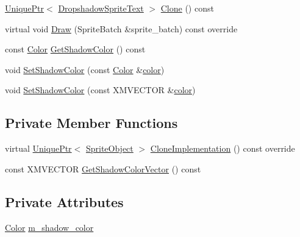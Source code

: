 \begin{DoxyCompactItemize}
\item 
\hyperlink{namespacemage_a8c307fbcc33bce9b7f2aa4c26c3b95cf}{Unique\+Ptr}$<$ \hyperlink{classmage_1_1_dropshadow_sprite_text}{Dropshadow\+Sprite\+Text} $>$ \hyperlink{classmage_1_1_dropshadow_sprite_text_a0dcce82b4a83fbd469d68adba21af220}{Clone} () const
\item 
virtual void \hyperlink{classmage_1_1_dropshadow_sprite_text_af76422c9812d7dc38e9b98e587103c67}{Draw} (Sprite\+Batch \&sprite\+\_\+batch) const override
\item 
const \hyperlink{structmage_1_1_color}{Color} \hyperlink{classmage_1_1_dropshadow_sprite_text_a776c11dfe60ad8c0c6f356c5f0f95af6}{Get\+Shadow\+Color} () const
\item 
void \hyperlink{classmage_1_1_dropshadow_sprite_text_abefcf9a3bd234df3996950410eefe1bf}{Set\+Shadow\+Color} (const \hyperlink{structmage_1_1_color}{Color} \&\hyperlink{namespacemage_a56eceea5a9bceb2b56073f3ea4945781}{color})
\item 
void \hyperlink{classmage_1_1_dropshadow_sprite_text_a8069cb327cc61dd92d516c793d9c49e7}{Set\+Shadow\+Color} (const X\+M\+V\+E\+C\+T\+OR \&\hyperlink{namespacemage_a56eceea5a9bceb2b56073f3ea4945781}{color})
\end{DoxyCompactItemize}
\subsection*{Private Member Functions}
\begin{DoxyCompactItemize}
\item 
virtual \hyperlink{namespacemage_a8c307fbcc33bce9b7f2aa4c26c3b95cf}{Unique\+Ptr}$<$ \hyperlink{classmage_1_1_sprite_object}{Sprite\+Object} $>$ \hyperlink{classmage_1_1_dropshadow_sprite_text_ae4b94b4120a9cae6bae11b61e7aed39b}{Clone\+Implementation} () const override
\item 
const X\+M\+V\+E\+C\+T\+OR \hyperlink{classmage_1_1_dropshadow_sprite_text_aedba26fc177c68e0553785a731d3d391}{Get\+Shadow\+Color\+Vector} () const
\end{DoxyCompactItemize}
\subsection*{Private Attributes}
\begin{DoxyCompactItemize}
\item 
\hyperlink{structmage_1_1_color}{Color} \hyperlink{classmage_1_1_dropshadow_sprite_text_a6343fd2b2b2139d8a869c29a2a33531f}{m\+\_\+shadow\+\_\+color}
\end{DoxyCompactItemize}
